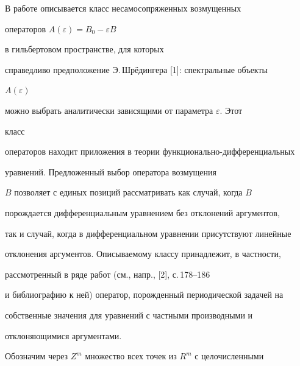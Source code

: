 \date{} 




\pagestyle{plain} %


 




\maketitle 


\label{begin} 


 


 


В работе описывается класс несамосопряженных возмущенных 


операторов $A(\varepsilon)=B_0-\varepsilon B$ 


в гильбертовом пространстве, для которых 


справедливо предположение Э.\,Шр\"едингера [1]: спектральные объекты 


$A(\varepsilon)$ 


можно выбрать аналитически зависящими от параметра $\varepsilon$. Этот 


класс 


операторов находит приложения в теории функционально-дифференциальных 


уравнений. Предложенный выбор оператора возмущения 


$B$ позволяет с единых позиций рассматривать как случай, когда $B$ 


порождается дифференциальным уравнением без отклонений аргументов, 


так и случай, когда в дифференциальном уравнении присутствуют линейные 


отклонения аргументов. Описываемому классу принадлежит, в частности, 


рассмотренный в ряде работ (см., напр., [2], с.\,178--186 


и библиографию к ней) оператор, порожденный периодической задачей на 


собственные значения для уравнений с частными производными и 


отклоняющимися аргументами. 


 


Обозначим через $Z^m$ множество всех точек из $R^m$ с целочисленными 


